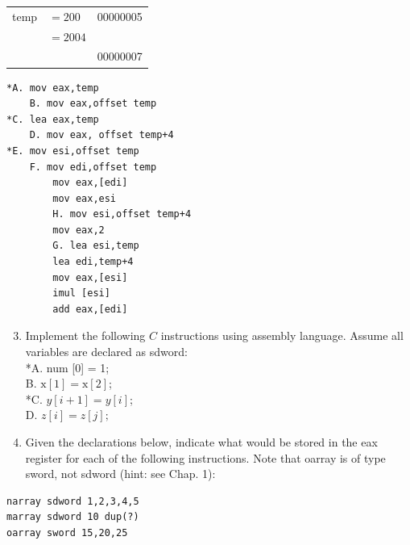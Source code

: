 \documentclass[10pt]{article}
\begin{document}
\begin{center}
\begin{tabular}{rl|l|}
temp & $=200$ & 00000005 \\
 & $=2004$ &  \\
 &  & 00000007 \\
\hline
\end{tabular}
\end{center}

\begin{verbatim}
*A. mov eax,temp
    B. mov eax,offset temp
*C. lea eax,temp
    D. mov eax, offset temp+4
*E. mov esi,offset temp
    F. mov edi,offset temp
        mov eax,[edi]
        mov eax,esi
        H. mov esi,offset temp+4
        mov eax,2
        G. lea esi,temp
        lea edi,temp+4
        mov eax,[esi]
        imul [esi]
        add eax,[edi]
\end{verbatim}

\begin{enumerate}
  \setcounter{enumi}{2}
  \item Implement the following $C$ instructions using assembly language. Assume all variables are declared as sdword:\\[0pt]
*A. num [0] = 1;\\
B. $\mathrm{x}[1]=\mathrm{x}[2]$;\\
*C. $y[i+1]=y[i]$;\\
D. $z[i]=z[j] ;$
  \item Given the declarations below, indicate what would be stored in the eax register for each of the following instructions. Note that oarray is of type sword, not sdword (hint: see Chap. 1):
\end{enumerate}

\begin{verbatim}
narray sdword 1,2,3,4,5
marray sdword 10 dup(?)
oarray sword 15,20,25
\end{verbatim}
\end{document}
